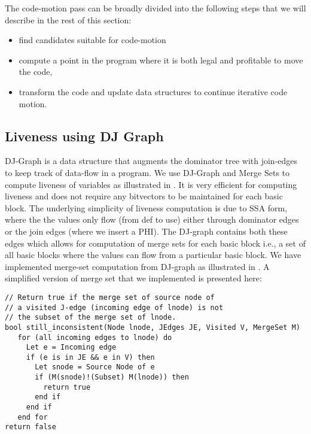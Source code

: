 \documentclass[acmlarge,review]{acmart}\settopmatter{printfolios=true}
\begin{document}
The code-motion pass can be broadly divided into the following steps that we will
describe in the rest of this section:
\begin{itemize}
\item find candidates suitable for code-motion
\item compute a point in the program where it is both legal and profitable to
  move the code,
\item transform the code and update data structures to continue iterative code
  motion.
\end{itemize}

\subsection{Liveness using DJ Graph}
DJ-Graph \cite{Sreedhar1996} is a data structure that augments the dominator
tree with join-edges to keep track of data-flow in a program. We use DJ-Graph
and Merge Sets to compute liveness of variables as illustrated in
\cite{das2012}.  It is very efficient for computing liveness and does not
require any bitvectors to be maintained for each basic block. The underlying
simplicity of liveness computation is due to SSA form, where the the values only
flow (from def to use) either through dominator edges or the join edges (where
we insert a PHI). The DJ-graph contains both these edges which allows for
computation of merge sets for each basic block i.e., a set of all basic blocks
where the values can flow from a particular basic block. We have implemented
merge-set computation from DJ-graph as illustrated in \cite{das2005}. A simplified
version of merge set that we implemented is presented here:

\begin{verbatim}
// Return true if the merge set of source node of
// a visited J-edge (incoming edge of lnode) is not
// the subset of the merge set of lnode.
bool still_inconsistent(Node lnode, JEdges JE, Visited V, MergeSet M)
   for (all incoming edges to lnode) do
     Let e = Incoming edge
     if (e is in JE && e in V) then
       Let snode = Source Node of e
       if (M(snode)!(Subset) M(lnode)) then
         return true
       end if
     end if
   end for
return false
\end{verbatim}
\end{document}
